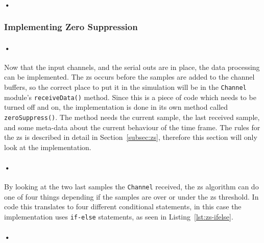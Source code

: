\documentclass[a4paper, 12pt, openright, twoside]{report}
\newcommand{\codeword}[1]{\texttt{#1}}
\begin{document}
\paragraph{•}
\begin{minipage}{\linewidth}

\end{minipage}

\subsubsection{Implementing Zero Suppression}

\paragraph{•} 
Now that the input channels, and the serial outs are in place, the data processing can be implemented.
The \gls{zs} occurs before the samples are added to the channel buffers, so the correct place to put it in the simulation will be in the \codeword{Channel} module's \codeword{receiveData()} method.
Since this is a piece of code which needs to be turned off and on, the implementation is done in its own method called \codeword{zeroSuppress()}.
The method needs the current sample, the last received sample, and some meta-data about the current behaviour of the time frame.
The rules for the \gls{zs} is described in detail in Section~\ref{subsec:zs}, therefore this section will only look at the implementation.

\paragraph{•}
By looking at the two last samples the \codeword{Channel} received, the \gls{zs} algorithm can do one of four things depending if the samples are over or under the \gls{zs} threshold.
In code this translates to four different conditional statements, in this case the implementation uses \codeword{if-else} statements, as seen in Listing~\ref{lst:zs-ifelse}.

\paragraph{•}
\begin{minipage}{\linewidth}

\end{minipage}
\end{document}
